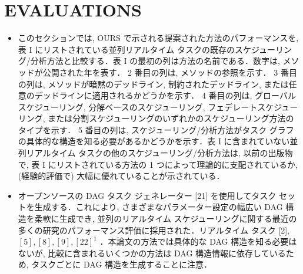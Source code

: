 
\section{EVALUATIONS}
\label{sec: evaluations}

\begin{frame}{}
    \begin{itemize}
        \item このセクションでは, OURS で示される提案された方法のパフォーマンスを, 表 I にリストされている並列リアルタイム タスクの既存のスケジューリング/分析方法と比較する．表 I の最初の列は方法の名前である．数字は, メソッドが公開された年を表す． 2 番目の列は, メソッドの参照を示す． 3 番目の列は, メソッドが暗黙のデッドライン, 制約されたデッドライン, または任意のデッドラインに適用されるかどうかを示す． 4 番目の列は, グローバル スケジューリング, 分解ベースのスケジューリング, フェデレートスケジューリング, または分割スケジューリングのいずれかのスケジューリング方法のタイプを示す． 5 番目の列は, スケジューリング/分析方法がタスク グラフの具体的な構造を知る必要があるかどうかを示す．表 I に含まれていない並列リアルタイム タスクの他のスケジューリング/分析方法は, 以前の出版物で, 表 I にリストされている方法の 1 つによって理論的に支配されているか, (経験的評価で) 大幅に優れていることが示されている．
    \end{itemize}
\end{frame}

\begin{frame}{}
    \begin{itemize}
        \item オープンソースの DAG タスク ジェネレーター [21] を使用してタスク セットを生成する．これにより, さまざまなパラメーター設定の幅広い DAG 構造を柔軟に生成でき, 並列のリアルタイム スケジューリングに関する最近の多くの研究のパフォーマンス評価に採用された．リアルタイム タスク [2], $[5],[8],[9],[22]^{1}$ ．本論文の方法では具体的な DAG 構造を知る必要はないが, 比較に含まれるいくつかの方法は DAG 構造情報に依存しているため, タスクごとに DAG 構造を生成することに注意．
    \end{itemize}
\end{frame}

